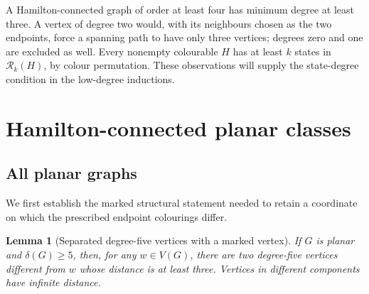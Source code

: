 \documentclass[11pt]{article}
\newtheorem{lemma}[theorem]{Lemma}
\theoremstyle{remark}
\newcommand{\Rk}{\mathcal R_k}
\numberwithin{equation}{section}
\numberwithin{table}{section}
\begin{document}
A Hamilton-connected graph of order at least four has minimum degree at
least three.  A vertex of degree two would, with its neighbours chosen
as the two endpoints, force a spanning path to have only three vertices;
degrees zero and one are excluded as well.  Every nonempty colourable
$H$ has at least $k$ states in $\Rk(H)$, by colour permutation.
These observations will supply the state-degree condition in the
low-degree inductions.

\section{Hamilton-connected planar classes}
\label{sec:hc-planar}

\subsection{All planar graphs}

We first establish the marked structural statement needed to retain a
coordinate on which the prescribed endpoint colourings differ.

\begin{lemma}[Separated degree-five vertices with a marked vertex]
\label{lem:marked-five}
If $G$ is planar and $\delta(G)\ge5$, then, for any $w\in V(G)$,
there are two degree-five vertices different from $w$ whose distance is
at least three.  Vertices in different components have infinite distance.
\end{lemma}
\end{document}
